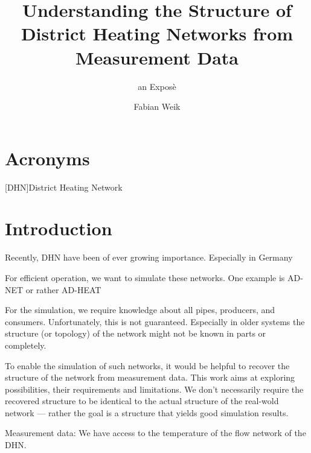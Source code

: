 \documentclass{scrartcl}
\title{Understanding the Structure of District Heating Networks from Measurement Data}
\subtitle{an Exposè}
\author{Fabian Weik}
\begin{document}
    \maketitle

    \section{Acronyms}

    \begin{acronym}
        [DHN]{District Heating Network}
    \end{acronym}

    \section{Introduction}

    Recently, \ac{DHN} have been of ever growing importance.
    Especially in Germany

    For efficient operation, we want to simulate these networks.
    One example is AD-NET or rather AD-HEAT

    For the simulation, we require knowledge about all pipes, producers, and consumers.
    Unfortunately, this is not guaranteed.
    Especially in older systems the structure (or topology) of the network might not be known in parts or completely.

    To enable the simulation of such networks, it would be helpful to recover the structure of the network from measurement data.
    This work aims at exploring possibilities, their requirements and limitations.
    We don't necessarily require the recovered structure to be identical to the actual structure of the real-wold network --- rather  the goal is a structure that yields good simulation results.

    Measurement data: We have access to the temperature of the flow network of the \ac{DHN}.
\end{document}
